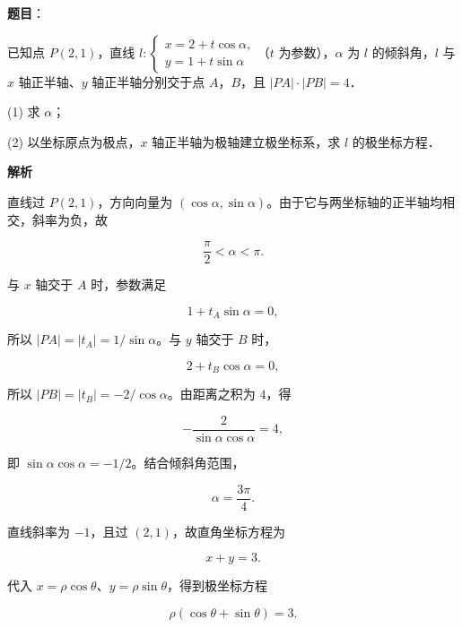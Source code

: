 \begin{answer}

\textbf{题目}：

已知点 $P(2,1)$，直线 $l:\begin{cases}x=2+t\cos\alpha,\\y=1+t\sin\alpha\end{cases}$（$t$ 为参数），$\alpha$ 为 $l$ 的倾斜角，$l$ 与 $x$ 轴正半轴、$y$ 轴正半轴分别交于点 $A$，$B$，且 $|PA|\cdot|PB|=4$．

  (1) 求 $\alpha$；

  (2) 以坐标原点为极点，$x$ 轴正半轴为极轴建立极坐标系，求 $l$ 的极坐标方程．

\textbf{解析}


直线过 $P(2,1)$，方向向量为 $(\cos\alpha,\sin\alpha)$。由于它与两坐标轴的正半轴均相交，斜率为负，故

\nopagebreak[4]
\[
\frac\pi2<\alpha<\pi.
\]

与 $x$ 轴交于 $A$ 时，参数满足

\nopagebreak[4]
\[
1+t_A\sin\alpha=0,
\]

所以 $|PA|=|t_A|=1/\sin\alpha$。与 $y$ 轴交于 $B$ 时，

\nopagebreak[4]
\[
2+t_B\cos\alpha=0,
\]

所以 $|PB|=|t_B|=-2/\cos\alpha$。由距离之积为 $4$，得

\nopagebreak[4]
\[
-\frac2{\sin\alpha\cos\alpha}=4,
\]

即 $\sin\alpha\cos\alpha=-1/2$。结合倾斜角范围，

\nopagebreak[4]
\[
\alpha=\frac{3\pi}{4}.
\]


直线斜率为 $-1$，且过 $(2,1)$，故直角坐标方程为

\nopagebreak[4]
\[
x+y=3.
\]

代入 $x=\rho\cos\theta$、$y=\rho\sin\theta$，得到极坐标方程

\nopagebreak[4]
\[
\rho(\cos\theta+\sin\theta)=3.
\]



\end{answer}
